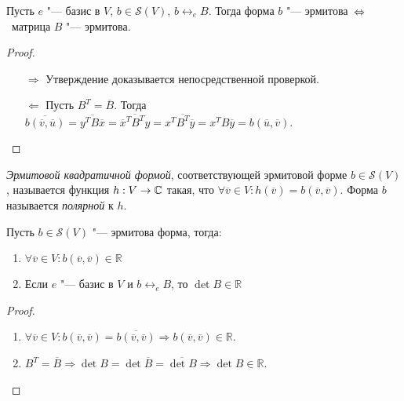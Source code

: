 \begin{theorem}
	Пусть $e$ "--- базис в $V$, $b \in \mathcal{S}(V)$, $b \leftrightarrow_e B$. Тогда форма $b$ "--- эрмитова~$ \hm\Leftrightarrow$~матрица $B$ "--- эрмитова.
\end{theorem}

\begin{proof}~
	\begin{itemize}
		\item[$\Rightarrow$] Утверждение доказывается непосредственной проверкой.
		\item[$\Leftarrow$] Пусть $B^T = \overline{B}$. Тогда $\overline{b(\overline{v}, \overline{u})} = \overline{y^TB\overline{x}} = \overline{\overline{x}^TB^Ty} = x^T\overline{B^T}\overline{y} = x^TB\overline{y} = b(\overline{u}, \overline{v})$.\qedhere
	\end{itemize}
\end{proof}

\begin{definition}
	\textit{Эрмитовой квадратичной формой}, соответствующей эрмитовой форме $b \in \mathcal{S}(V)$, называется функция $h: V \rightarrow \mathbb{C}$ такая, что $\forall \overline{v} \in V: h(\overline{v}) = b(\overline{v}, \overline{v})$. Форма $b$ называется \textit{полярной} к $h$.
\end{definition}

\begin{proposition}
	Пусть $b \in \mathcal{S}(V)$ "--- эрмитова форма, тогда:
	\begin{enumerate}
		\item $\forall \overline{v} \in V: b(\overline{v}, \overline{v}) \in \mathbb{R}$
		\item Если $e$ "--- базис в $V$ и $b \leftrightarrow_e B$, то $\det{B} \in \mathbb{R}$
	\end{enumerate}
\end{proposition}

\begin{proof}~
	\begin{enumerate}
		\item $\forall \overline{v} \in V: b(\overline{v}, \overline{v}) = \overline{b(\overline{v}, \overline{v})} \Rightarrow b(\overline{v}, \overline{v}) \in \mathbb{R}$.
		\item $B^T = \overline{B} \Rightarrow \det{B} = \det{\overline{B}} = \overline{\det{B}} \Rightarrow \det{B} \in \mathbb{R}$.\qedhere
	\end{enumerate}
\end{proof}

